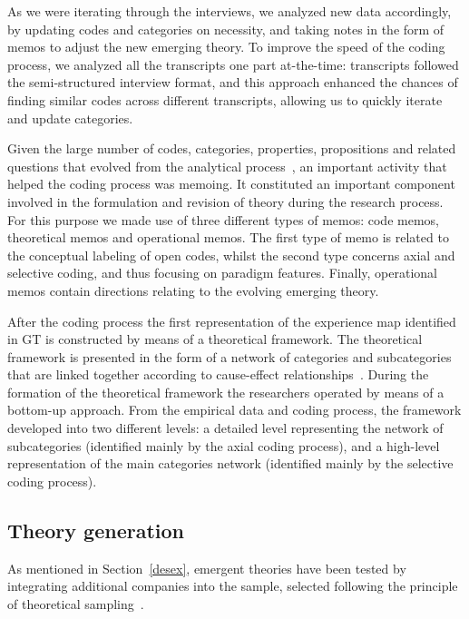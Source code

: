 \documentclass[10pt,journal,letterpaper,compsoc]{IEEEtran}
\begin{document}
As we were iterating through the interviews, we analyzed new data accordingly,
by updating codes and categories on necessity, and taking notes in the form of
memos to adjust the new emerging theory. To improve the speed of the coding
process, we analyzed all the transcripts one part at-the-time: transcripts
followed the semi-structured interview format, and this approach enhanced the
chances of finding similar codes across different transcripts, allowing us to
quickly iterate and update categories.

Given the large number of codes, categories, properties, propositions and
related questions that evolved from the analytical process~\cite{Corbin1990},
an important activity that helped the coding process was memoing. It constituted
an important component involved in the formulation and revision of theory
during the research process. For this purpose we made use of three different
types of memos: code memos, theoretical memos and operational memos. The first
type of memo is related to the conceptual labeling of open codes, whilst the
second type concerns axial and selective coding, and thus focusing on paradigm
features. Finally, operational memos contain directions relating to the evolving
emerging theory.

After the coding process the first representation of the experience map
identified in GT is constructed by means of a theoretical framework. The
theoretical framework is presented in the form of a network of categories and
subcategories that are linked together according to cause-effect 
relationships~\cite{Corbin1990}. During the formation of the theoretical 
framework the researchers operated by means of a bottom-up approach. From the 
empirical data and coding process, the framework developed into two different 
levels: a detailed level representing the network of subcategories (identified 
mainly by the axial coding process), and a high-level representation of the main
categories network (identified mainly by the selective coding process).

\subsection{Theory generation}

As mentioned in Section~\ref{desex}, emergent theories have been tested by
integrating additional companies into the sample, selected following the
principle of theoretical sampling~\cite{Yin1994}.
\end{document}
